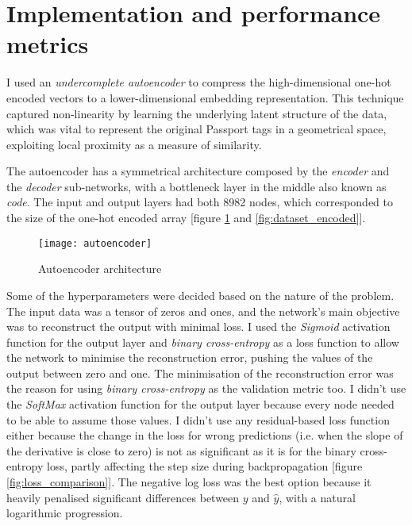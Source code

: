 
\section{Implementation and performance metrics}

I used an \textit{undercomplete autoencoder} to compress the high-dimensional one-hot encoded vectors to a lower-dimensional embedding representation.
This technique captured non-linearity by learning the underlying latent structure of the data, which was vital to represent the original
Passport tags in a geometrical space, exploiting local proximity as a measure of similarity.

The autoencoder has a symmetrical architecture composed by the \textit{encoder} and the \textit{decoder} sub-networks,
with a bottleneck layer in the middle also known as \textit{code}.
The input and output layers had both 8982 nodes, which corresponded to the size of the one-hot encoded array
[figure \ref{fig:autoencoder} and \ref{fig:dataset_encoded}].

\begin{figure}[H]
  \centering
  \texttt{[image: autoencoder]}
  \caption{Autoencoder architecture}
  \label{fig:autoencoder}
\end{figure}

Some of the hyperparameters were decided based on the nature of the problem.
The input data was a tensor of zeros and ones, and the network's main objective was to reconstruct the output with minimal loss.
I used the \textit{Sigmoid} activation function for the output layer and \textit{binary cross-entropy} as a loss function
to allow the network to minimise the reconstruction error, pushing the values of the output between zero and one.
The minimisation of the reconstruction error was the reason for using \textit{binary cross-entropy} as the validation metric too.
I didn't use the \textit{SoftMax} activation function for the output layer because every node needed to be able to assume those values.
I didn't use any residual-based loss function either because the change in the loss for wrong predictions
(i.e. when the slope of the derivative is close to zero) is not as significant as it is for the binary cross-entropy loss,
partly affecting the step size during backpropagation [figure \ref{fig:loss_comparison}].
The negative log loss was the best option because it heavily penalised significant differences between $y$ and $\hat{y}$,
with a natural logarithmic progression.


